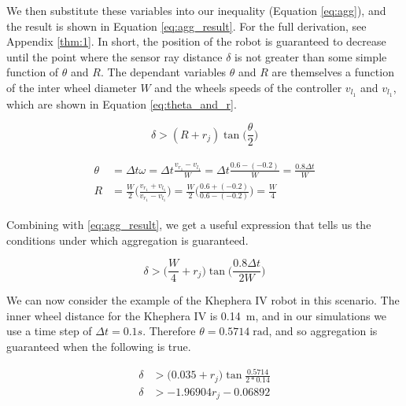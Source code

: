 \documentclass[conference]{IEEEtran}
\begin{document}
  We then substitute these variables into our inequality (Equation \ref{eq:agg}), and the result is shown in Equation \ref{eq:agg_result}. For the full derivation, see Appendix \ref{thm:1}. In short, the position of the robot is guaranteed to decrease until the point where the sensor ray distance $\delta$ is not greater than some simple function of $\theta$ and $R$. The dependant variables $\theta$ and $R$ are themselves a function of the inter wheel diameter $W$ and the wheels speeds of the controller $v_{l_1}$ and $v_{l_1}$, which are shown in Equation \ref{eq:theta_and_r}.

  \begin{equation*} \label{eq:agg_result}
    \delta > (R + r_j)\tan\bigg(\frac{\theta}{2}\bigg)
  \end{equation*}

  \begin{align}
    \begin{split} \label{eq:theta_and_r}
      \theta &= \Delta t\omega = \Delta t \frac{v_{r_1} - v_{l_1}}{W} = \Delta t \frac{0.6 - (-0.2)}{W} = \frac{0.8\Delta t}{W} \\
      R &= \frac{W}{2}\bigg(\frac{v_{r_1} + v_{l_1}}{v_{r_1} - v_{l_1}}\bigg) = \frac{W}{2}\bigg(\frac{0.6 + (-0.2)}{0.6 - (-0.2)}\bigg) = \frac{W}{4}
    \end{split}
  \end{align}

  Combining \label{eq:theta_and_r} with \ref{eq:agg_result}, we get a useful expression that tells us the conditions under which aggregation is guaranteed.

  \begin{equation*} \label{eq:agg_final_result}
    \delta > \bigg(\frac{W}{4} + r_j\bigg)\tan\bigg(\frac{0.8\Delta t}{2W}\bigg)
  \end{equation*}

  We can now consider the example of the Khephera IV robot in this scenario. The inner wheel distance for the Khephera IV is \SI{0.14}{\meter}, and in our simulations we use a time step of $\Delta t = 0.1s$. Therefore $\theta = 0.5714\;\text{rad}$, and so aggregation is guaranteed when the following is true.

  \begin{equation} \label{eq:khephera_agg}
    \begin{split}
      \delta &> \bigg(0.035 + r_j\bigg)\tan\frac{0.5714}{2*0.14} \\
      \delta &> -1.96904 r_j - 0.06892
    \end{split}
  \end{equation}
\end{document}
